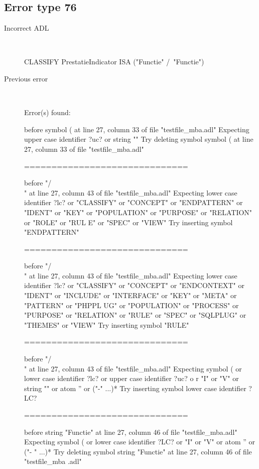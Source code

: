 \hrulefill

\subsection{Error type 76}
  \begin{description}
  \item[Incorrect ADL]~\\
\begin{adl}
CLASSIFY PrestatieIndicator ISA ("Functie" /\ "Functie")\end{adl}
  \item[Previous error]~\\
\begin{haskell}
Error(s) found:

before symbol ( at line 27, column 33 of file "testfile_mba.adl"
Expecting upper case identifier ?uc? or string ""
Try deleting symbol symbol ( at line 27, column 33 of file "testfile_mba.adl"

==============================

before "/\\" at line 27, column 43 of file "testfile_mba.adl"
Expecting lower case identifier ?lc? or "CLASSIFY" or "CONCEPT" or "ENDPATTERN"
or "IDENT" or "KEY" or "POPULATION" or "PURPOSE" or "RELATION" or "ROLE" or "RUL
E" or "SPEC" or "VIEW"
Try inserting symbol "ENDPATTERN"

==============================

before "/\\" at line 27, column 43 of file "testfile_mba.adl"
Expecting lower case identifier ?lc? or "CLASSIFY" or "CONCEPT" or "ENDCONTEXT"
or "IDENT" or "INCLUDE" or "INTERFACE" or "KEY" or "META" or "PATTERN" or "PHPPL
UG" or "POPULATION" or "PROCESS" or "PURPOSE" or "RELATION" or "RULE" or "SPEC"
or "SQLPLUG" or "THEMES" or "VIEW"
Try inserting symbol "RULE"

==============================

before "/\\" at line 27, column 43 of file "testfile_mba.adl"
Expecting symbol ( or lower case identifier ?lc? or upper case identifier ?uc? o
r "I" or "V" or string "" or atom '' or ("-" ...)*
Try inserting symbol lower case identifier ?LC?

==============================

before string "Functie" at line 27, column 46 of file "testfile_mba.adl"
Expecting symbol ( or lower case identifier ?LC? or "I" or "V" or atom '' or ("-
" ...)*
Try deleting symbol string "Functie" at line 27, column 46 of file "testfile_mba
.adl"


\end{haskell}
\end{description}

